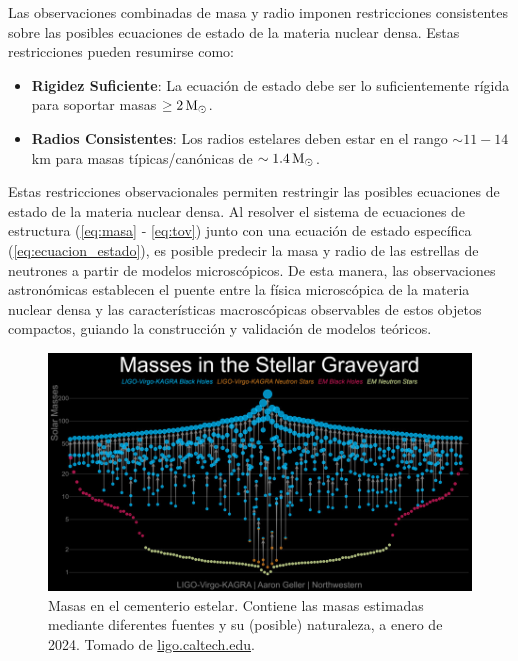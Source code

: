 Las observaciones combinadas de masa y radio imponen restricciones consistentes sobre las posibles ecuaciones de estado de la materia nuclear densa. Estas restricciones pueden resumirse como:

\begin{itemize}
	\item \textbf{Rigidez Suficiente}: La ecuación de estado debe ser lo suficientemente rígida para soportar masas $\geq 2 \,\text{M}_\odot$.
	
	\item \textbf{Radios Consistentes}: Los radios estelares deben estar en el rango $\sim 11-14$ km para masas típicas/canónicas de $\sim 1.4 \,\text{M}_\odot$.
\end{itemize}

Estas restricciones observacionales permiten restringir las posibles ecuaciones de estado de la materia nuclear densa. Al resolver el sistema de ecuaciones de estructura (\ref{eq:masa} - \ref{eq:tov}) junto con una ecuación de estado específica (\ref{eq:ecuacion_estado}), es posible predecir la masa y radio de las estrellas de neutrones a partir de modelos microscópicos. De esta manera, las observaciones astronómicas establecen el puente entre la física microscópica de la materia nuclear densa y las características macroscópicas observables de estos objetos compactos, guiando la construcción y validación de modelos teóricos.

\begin{figure}[h]
	\centering
	\includegraphics[width=0.7\linewidth]{Figuras/ligo-virgo-graveyard}
	\caption[Cementerio estelar]{Masas en el cementerio estelar. Contiene las masas estimadas mediante diferentes fuentes y su (posible) naturaleza, a enero de 2024. Tomado de \href{https://www.ligo.caltech.edu/image/ligo20250826d}{ligo.caltech.edu}.}
	\label{fig:ligo-virgo-graveyard}
\end{figure}

